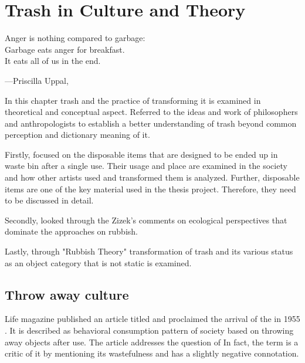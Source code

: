 \chapter{Trash in Culture and Theory}





\epigraph{Anger is nothing compared to garbage:\\ Garbage eats anger for breakfast.\\ It eats all of us in the end.}{\hfill---Priscilla Uppal, }





%
%
In this chapter trash and the practice of transforming it is examined in theoretical and conceptual aspect. Referred to the ideas and work of philosophers and anthropologists to establish a better understanding of trash beyond common perception and dictionary meaning of it. 

Firstly, focused on the disposable items that are designed to be ended up in waste bin after a single use. Their usage and place are examined in the society and how other artists used and transformed them is analyzed. Further, disposable items are one of the key material used in the thesis project. Therefore, they need to be discussed in detail.

Secondly, looked through the Zizek's comments on ecological perspectives that dominate the approaches on rubbish.

Lastly, through "Rubbish Theory" transformation of trash and its various status as an object category that is not static is examined.  





%
%
\section{Throw away culture}





Life magazine published an article titled  and proclaimed the arrival of the  in 1955 . It is described as behavioral consumption pattern of society based on throwing away objects after use. The article addresses the question of 
 In fact, the term   is a critic of it by mentioning its wastefulness and has a slightly negative connotation. 


